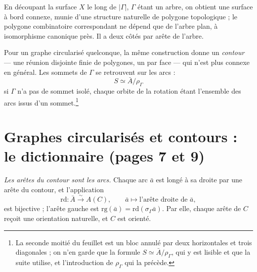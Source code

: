 \documentclass[11pt,a4paper]{article}
\begin{document}
En découpant la surface $X$ le long de $|\Gamma|$, $\Gamma$ étant un arbre, on
obtient une surface à bord connexe, munie d'une structure naturelle de polygone
topologique ; le polygone combinatoire correspondant ne dépend que de l'arbre
plan, à isomorphisme canonique près. Il a deux côtés par arête de l'arbre.

Pour un graphe circularisé quelconque, la même construction donne un
\emph{contour} --- une réunion disjointe finie de polygones, un par face ---
qui n'est plus connexe en général. Les sommets de $\Gamma$ se retrouvent sur les
arcs :
\[
S \simeq \bar{A}/\rho_{\Gamma}
\]
si $\Gamma$ n'a pas de sommet isolé, chaque orbite de la rotation étant
l'ensemble des arcs issus d'un sommet.\footnote{La seconde moitié du feuillet
est un bloc annulé par deux horizontales et trois diagonales ; on n'en garde que
la formule $S \simeq \bar{A}/\rho_{\Gamma}$, qui y est lisible et que la suite
utilise, et l'introduction de $\rho_{\Gamma}$ qui la précède.}

\section*{Graphes circularisés et contours : le dictionnaire (pages 7 et 9)}

\emph{Les arêtes du contour sont les arcs.} Chaque arc $\bar{a}$ est longé à sa
droite par une arête du contour, et l'application
\[
\mathrm{rd} : \bar{A} \xrightarrow{\;\sim\;} A(C),
\qquad \bar{a} \longmapsto \text{l'arête droite de } \bar{a},
\]
est bijective ; l'arête gauche est $\mathrm{rg}(\bar{a}) =
\mathrm{rd}(\sigma_{\Gamma}\bar{a})$. Par elle, chaque arête de $C$ reçoit une
orientation naturelle, et $C$ est orienté.
\end{document}
